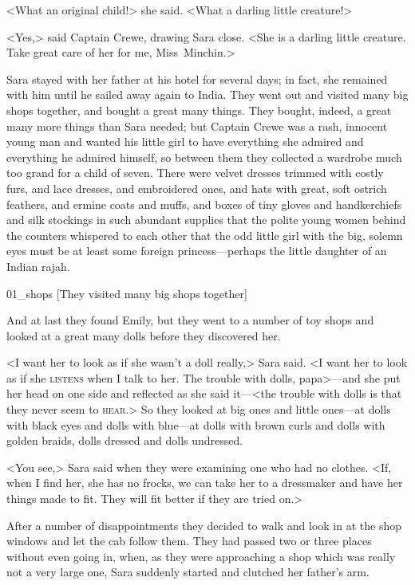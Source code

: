 <What an original child!> she said. <What a darling little creature!>

<Yes,> said Captain Crewe, drawing Sara close. <She is a darling little creature. Take great care of her for me, Miss~Minchin.>

Sara stayed with her father at his hotel for several days; in fact, she remained with him until he sailed away again to India. They went out and visited many big shops together, and bought a great many things. They bought, indeed, a great many more things than Sara needed; but Captain Crewe was a rash, innocent young man and wanted his little girl to have everything she admired and everything he admired himself, so between them they collected a wardrobe much too grand for a child of seven. There were velvet dresses trimmed with costly furs, and lace dresses, and embroidered ones, and hats with great, soft ostrich feathers, and ermine coats and muffs, and boxes of tiny gloves and handkerchiefs and silk stockings in such abundant supplies that the polite young women behind the counters whispered to each other that the odd little girl with the big, solemn eyes must be at least some foreign princess—perhaps the little daughter of an Indian rajah.

\begin{colorbigpic}
	[\basicscale]
	{01_shops}
	[They visited many big shops together]
\end{colorbigpic}

And at last they found Emily, but they went to a number of toy shops and looked at a great many dolls before they discovered her.

<I want her to look as if she wasn't a doll really,> Sara said. <I want her to look as if she \textsc{listens} when I talk to her. The trouble with dolls, papa>—and she put her head on one side and reflected as she said it—<the trouble with dolls is that they never seem to \textsc{hear}.> So they looked at big ones and little ones—at dolls with black eyes and dolls with blue—at dolls with brown curls and dolls with golden braids, dolls dressed and dolls undressed.

<You see,> Sara said when they were examining one who had no clothes. <If, when I find her, she has no frocks, we can take her to a dressmaker and have her things made to fit. They will fit better if they are tried on.>

After a number of disappointments they decided to walk and look in at the shop windows and let the cab follow them. They had passed two or three places without even going in, when, as they were approaching a shop which was really not a very large one, Sara suddenly started and clutched her father's arm.

